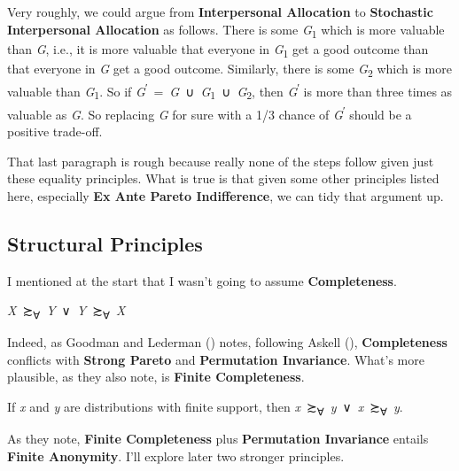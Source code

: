 \documentclass[
  11pt,
  letterpaper,
  DIV=11,
  numbers=noendperiod,
  twoside]{scrartcl}
\providecommand{\tightlist}{%
  \setlength{\itemsep}{0pt}\setlength{\parskip}{0pt}}
\begin{document}
Very roughly, we could argue from \textbf{Interpersonal Allocation} to
\textbf{Stochastic Interpersonal Allocation} as follows. There is some
\emph{G}\textsubscript{1} which is more valuable than \emph{G}, i.e., it
is more valuable that everyone in \emph{G}\textsubscript{1} get a good
outcome than that everyone in \emph{G} get a good outcome. Similarly,
there is some \emph{G}\textsubscript{2} which is more valuable than
\emph{G}\textsubscript{1}. So if
\emph{G}\textsuperscript{′}~=~\emph{G}~∪~\emph{G}\textsubscript{1}~∪~\emph{G}\textsubscript{2},
then \emph{G}\textsuperscript{′} is more than three times as valuable as
\emph{G}. So replacing \emph{G} for sure with a 1/3 chance of
\emph{G}\textsuperscript{′} should be a positive trade-off.

That last paragraph is rough because really none of the steps follow
given just these equality principles. What is true is that given some
other principles listed here, especially \textbf{Ex Ante Pareto
Indifference}, we can tidy that argument up.

\subsection{Structural Principles}\label{structural-principles}

I mentioned at the start that I wasn't going to assume
\textbf{Completeness}.

\begin{description}
\tightlist
\item[Completeness]
\emph{X}~≿\textsubscript{∀}~\emph{Y}~∨~\emph{Y}~≿\textsubscript{∀}~\emph{X}
\end{description}

Indeed, as Goodman and Lederman
() notes, following Askell
(), \textbf{Completeness} conflicts with
\textbf{Strong Pareto} and \textbf{Permutation Invariance}. What's more
plausible, as they also note, is \textbf{Finite Completeness}.

\begin{description}
\tightlist
\item[Finite Completeness]
If \emph{x} and \emph{y} are distributions with finite support, then
\emph{x}~≿\textsubscript{∀}~\emph{y}~∨~\emph{x}~≿\textsubscript{∀}~\emph{y}.
\end{description}

As they note, \textbf{Finite Completeness} plus \textbf{Permutation
Invariance} entails \textbf{Finite Anonymity}. I'll explore later two
stronger principles.
\end{document}
